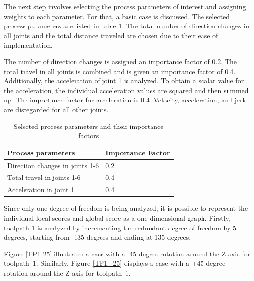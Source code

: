 The next step involves selecting the process parameters of interest and assigning weights to each parameter. For that, a basic case is discussed. The selected process parameters are listed in table \ref{PPbasic}. The total number of direction changes in all joints and the total distance traveled are chosen due to their ease of implementation.

The number of direction changes is assigned an importance factor of 0.2.
The total travel in all joints is combined and is given an importance factor of 0.4.
Additionally, the acceleration of joint 1 is analyzed. To obtain a scalar value for the acceleration, the individual acceleration values are squared and then summed up. The importance factor for acceleration is 0.4.
Velocity, acceleration, and jerk are disregarded for all other joints.

\begin{table}[H]
	\centering
	\begin{tabular}{||l|l||}
		Process parameters& Importance Factor \\
		\hline
		\hline
		\hline
		Direction changes in joints 1-6	&		0.2 \\
		Total travel in joints 1-6	&  	0.4 \\
		Acceleration in joint 1	& 		0.4\\
		
		\hline
		\hline
	\end{tabular}
	
	\caption{Selected process parameters and their importance factors}
	\label{PPbasic}
\end{table}


Since only one degree of freedom is being analyzed, it is possible to represent the individual local scores and global score as a one-dimensional graph. Firstly, toolpath 1 is analyzed by incrementing the redundant degree of freedom by 5 degrees, starting from -135 degrees and ending at 135 degrees.

Figure \ref{TP1-25} illustrates a case with a -45-degree rotation around the Z-axis for toolpath~1.
Similarly, Figure \ref{TP1+25} displays a case with a +45-degree rotation around the Z-axis for toolpath~1.

